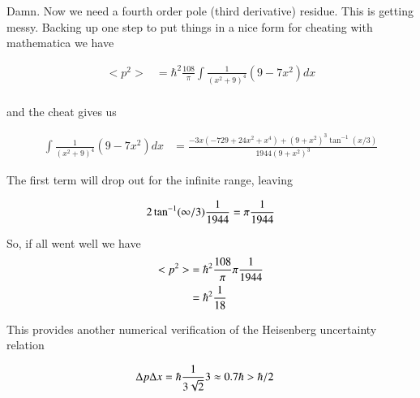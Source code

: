 \documentclass{article}
\begin{document}
Damn.  Now we need a fourth order pole (third derivative) residue.  This is getting messy.  Backing up one step to put
things in a nice form for cheating with mathematica we have

\begin{align*}
<p^2> &= \hbar^2 \frac{108}{\pi} \int \frac{1}{(x^2 + 9)^4} \left(9 - 7x^2 \right) dx \\
\end{align*}

and the cheat gives us

\begin{align*}
\int \frac{1}{(x^2 + 9)^4} \left(9 - 7x^2 \right) dx 
&= \frac{-3 x (-729 + 24 x^2 + x^4) + (9 + x^2)^3 \tan^{-1}(x/3)}{1944 (9 + x^2)^3}
\end{align*}

The first term will drop out for the infinite range, leaving 

\begin{align*}
2\tan^{-1}(\infty/3)\frac{1}{1944} = \pi \frac{1}{1944}
\end{align*}

So, if all went well we have
\begin{align*}
<p^2> 
&= \hbar^2 \frac{108}{\pi} \pi \frac{1}{1944} \\
&= \hbar^2 \frac{1}{18}
\end{align*}

This provides another numerical verification of the Heisenberg uncertainty relation

\begin{align*}
\Delta p \Delta x &= \hbar \frac{1}{3 \sqrt{2}} 3 \approx 0.7 \hbar > \hbar/2
\end{align*}



\end{document}
